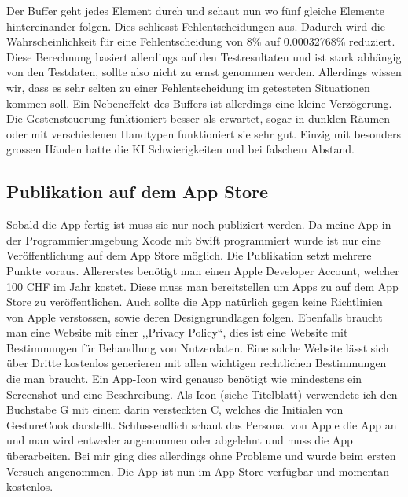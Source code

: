 \documentclass[12pt]{article}
\begin{document}
Der Buffer geht jedes Element durch und schaut nun wo fünf gleiche Elemente hintereinander folgen. Dies schliesst Fehlentscheidungen aus. Dadurch wird die Wahrscheinlichkeit für eine Fehlentscheidung von 8\%  auf 0.00032768\% reduziert. Diese Berechnung basiert allerdings auf den Testresultaten und ist stark abhängig von den Testdaten, sollte also nicht zu ernst genommen werden. Allerdings wissen wir, dass es sehr selten zu einer Fehlentscheidung im getesteten Situationen kommen soll. Ein Nebeneffekt des Buffers ist allerdings eine kleine Verzögerung. Die Gestensteuerung funktioniert besser als erwartet, sogar in dunklen Räumen oder mit verschiedenen Handtypen funktioniert sie sehr gut. Einzig mit besonders grossen Händen hatte die KI  Schwierigkeiten und bei falschem Abstand.

\subsection{Publikation auf dem App Store}
Sobald die App fertig ist muss sie nur noch publiziert werden. Da meine App in der Programmierumgebung Xcode mit Swift programmiert wurde ist nur eine Veröffentlichung auf dem App Store möglich. Die Publikation setzt mehrere Punkte voraus. Allererstes benötigt man einen Apple Developer Account, welcher 100 CHF im Jahr kostet. Diese muss man bereitstellen um Apps zu auf dem App Store zu veröffentlichen. Auch sollte die App natürlich gegen keine Richtlinien von Apple verstossen, sowie deren Designgrundlagen folgen. Ebenfalls braucht man eine Website mit einer ,,Privacy Policy``, dies ist eine Website mit Bestimmungen für Behandlung von Nutzerdaten. Eine solche Website lässt sich über Dritte kostenlos generieren mit allen wichtigen rechtlichen Bestimmungen die man braucht. Ein App-Icon wird genauso benötigt wie mindestens ein Screenshot und eine Beschreibung. Als Icon (siehe Titelblatt) verwendete ich den Buchstabe G mit einem darin versteckten C, welches die Initialen von GestureCook darstellt. Schlussendlich schaut das Personal von Apple die App an und man wird entweder angenommen oder abgelehnt und muss die App überarbeiten. Bei mir ging dies allerdings ohne Probleme und wurde beim ersten Versuch angenommen. Die App ist nun im App Store verfügbar und momentan kostenlos.
\end{document}
